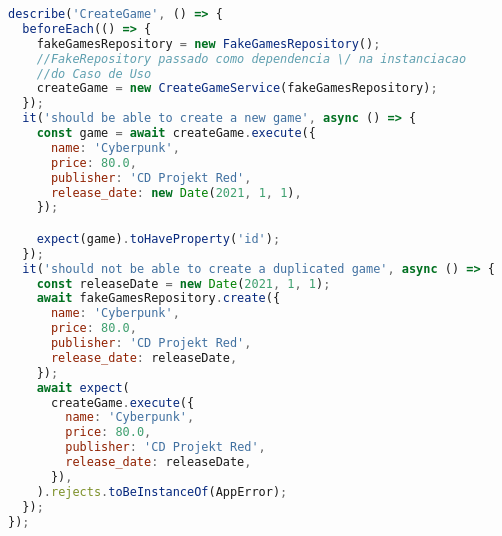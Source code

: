 \begin{lstlisting}[language=JavaScript, caption={Módulo de teste },captionpos=b, label=alg:creategametest]
describe('CreateGame', () => {
  beforeEach(() => {
    fakeGamesRepository = new FakeGamesRepository();
    //FakeRepository passado como dependencia \/ na instanciacao 
    //do Caso de Uso
    createGame = new CreateGameService(fakeGamesRepository);
  });
  it('should be able to create a new game', async () => {
    const game = await createGame.execute({
      name: 'Cyberpunk',
      price: 80.0,
      publisher: 'CD Projekt Red',
      release_date: new Date(2021, 1, 1),
    });

    expect(game).toHaveProperty('id');
  });
  it('should not be able to create a duplicated game', async () => {
    const releaseDate = new Date(2021, 1, 1);
    await fakeGamesRepository.create({
      name: 'Cyberpunk',
      price: 80.0,
      publisher: 'CD Projekt Red',
      release_date: releaseDate,
    });
    await expect(
      createGame.execute({
        name: 'Cyberpunk',
        price: 80.0,
        publisher: 'CD Projekt Red',
        release_date: releaseDate,
      }),
    ).rejects.toBeInstanceOf(AppError);
  });
});
\end{lstlisting}